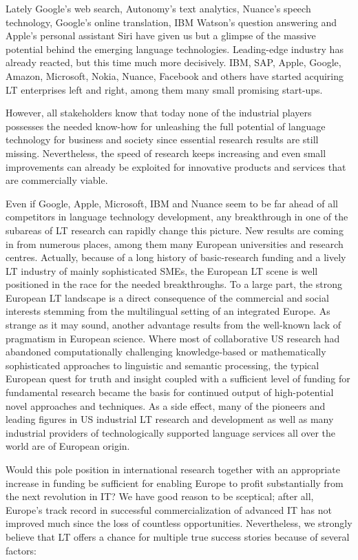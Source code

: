 \documentclass[10pt, plain]{../../metanetpaper}
\begin{document}
\begin{multicols}{2}
Lately Google's web search, Autonomy's text analytics, Nuance's speech technology, Google's online translation, IBM Watson's question answering and Apple's personal assistant Siri have given us but a glimpse of the massive potential behind the emerging language technologies. Leading-edge industry has already reacted, but this time much more decisively. IBM, SAP, Apple, Google, Amazon, Microsoft, Nokia, Nuance, Facebook and others have started acquiring LT enterprises left and right, among them many small promising start-ups.

However, all stakeholders know that today none of the industrial players possesses the needed know-how for unleashing the full potential of language technology for business and society since essential research results are still missing. Nevertheless, the speed of research keeps increasing and even small improvements can already be exploited for innovative products and services that are commercially viable.

Even if Google, Apple, Microsoft, IBM and Nuance seem to be far ahead of all competitors in language technology development, any breakthrough in one of the subareas of LT research can rapidly change this picture. New results are coming in from numerous places, among them many European universities and research centres. Actually, because of a long history of basic-research funding and a lively LT industry of mainly sophisticated SMEs, the European LT scene is well positioned in the race for the needed breakthroughs. To a large part, the strong European LT landscape is a direct consequence of the commercial and social interests stemming from the multilingual setting of an integrated Europe. As strange as it may sound, another advantage results from the well-known lack of pragmatism in European science. Where most of collaborative US research had abandoned computationally challenging knowledge-based or mathematically sophisticated approaches to linguistic and semantic processing, the typical European quest for truth and insight coupled with a sufficient level of funding for fundamental research became the basis for continued output of high-potential novel approaches and techniques. As a side effect, many of the pioneers and leading figures in US industrial LT research and development as well as many industrial providers of technologically supported language services all over the world are of European origin.

Would this pole position in international research together with an appropriate increase in funding be sufficient for enabling Europe to profit substantially from the next revolution in IT? We have good reason to be sceptical; after all, Europe’s track record in successful commercialization of advanced IT has not improved much since the loss of countless opportunities. Nevertheless, we strongly believe that LT offers a chance for multiple true success stories because of several factors:


\end{multicols}
\end{document}
